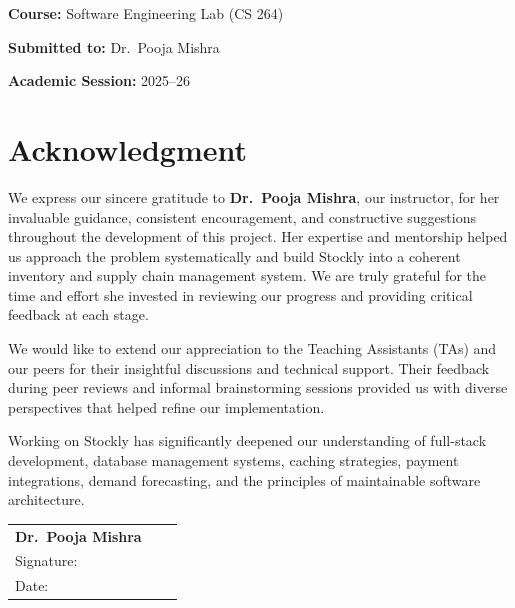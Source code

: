 \documentclass[12pt,a4paper]{report}
\begin{document}
\begin{titlepage}
\begin{center}
        \vspace{0.7cm}

        {\large\textbf{Course:} \textcolor{linkblue}{Software Engineering Lab (CS 264)}}

        \vspace{0.45cm}

        {\large\textbf{Submitted to:} \textcolor{linkblue}{Dr.\ Pooja Mishra}}

        \vspace{0.45cm}

        {\large\textbf{Academic Session:} \textcolor{linkblue}{2025--26}}

    \end{center}
\end{titlepage}

\clearpage

\section*{Acknowledgment}

We express our sincere gratitude to \textbf{Dr.\ Pooja Mishra}, our instructor, for her invaluable guidance, consistent encouragement, and constructive suggestions throughout the development of this project. Her expertise and mentorship helped us approach the problem systematically and build Stockly into a coherent inventory and supply chain management system. We are truly grateful for the time and effort she invested in reviewing our progress and providing critical feedback at each stage.

We would like to extend our appreciation to the Teaching Assistants (TAs) and our peers for their insightful discussions and technical support. Their feedback during peer reviews and informal brainstorming sessions provided us with diverse perspectives that helped refine our implementation.

Working on Stockly has significantly deepened our understanding of full-stack development, database management systems, caching strategies, payment integrations, demand forecasting, and the principles of maintainable software architecture.

\vspace{2.2cm}
\noindent
\begin{tabular}{p{6cm}p{1cm}p{6cm}}
    \textbf{Dr.\ Pooja Mishra} \\[0.2cm]
    Signature: \underline{\hspace{4cm}} \\
    Date: \underline{\hspace{4.4cm}} \\
\end{tabular}
\end{document}
